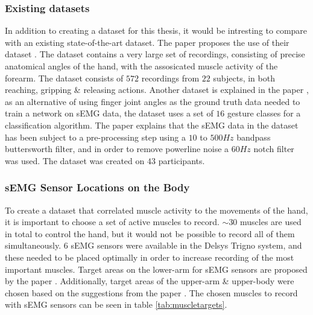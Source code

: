 \documentclass[../main.tex]{subfiles}
\begin{document}
\subsubsection{Existing datasets}

In addition to creating a dataset for this thesis, it would be intresting to compare with an existing state-of-the-art dataset.
The paper \cite{jarque2019} proposes the use of their dataset \cite{kinmusdataset}.
The dataset contains a very large set of recordings, consisting of precise anatomical angles of the hand, with the assosicated muscle activity of the forearm.
The dataset consists of $572$ recordings from $22$ subjects, in both reaching, gripping \& releasing actions.
Another dataset is explained in the paper \cite{ashirbad2022}, as an alternative of using finger joint angles as the ground truth data needed to train a network on sEMG data, the dataset uses a set of $16$ gesture classes for a classification algorithm.
The paper explains that the sEMG data in the dataset has been subject to a pre-processing step using a $10$ to $500Hz$ bandpass buttersworth filter, and in order to remove powerline noise a $60Hz$ notch filter was used.
The dataset was created on $43$ participants.


\subsubsection{sEMG Sensor Locations on the Body}

To create a dataset that correlated muscle activity to the movements of the hand, it is important to choose a set of active muscles to record.
$\sim 30$ muscles are used in total to control the hand, but it would not be possible to record all of them simultaneously.
6 sEMG sensors were available in the Delsys Trigno \cite{trigno} system, and these needed to be placed optimally in order to increase recording of the most important muscles.
Target areas on the lower-arm for sEMG sensors are proposed by the paper \cite{jarque2019}.
Additionally, target areas of the upper-arm \& upper-body were chosen based on the suggestions from the paper \cite{Batzianoulis2018}.
The chosen muscles to record with sEMG sensors can be seen in table \ref{tab:muscletargets}.
\end{document}
